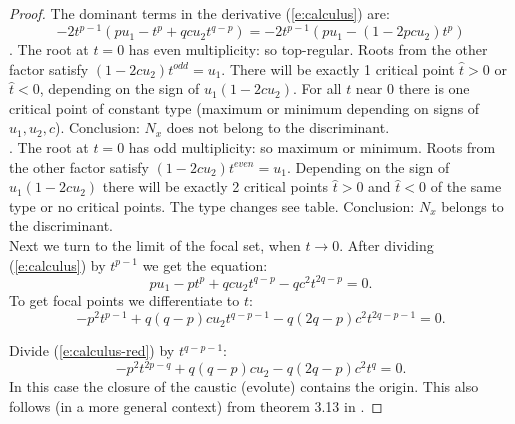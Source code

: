 \documentclass[12pt,a4,twoside]{amsart}
\newtheorem*{main lemma}{The main lemma}
\begin{document}
\begin{proof}
\noindent
{} The dominant terms in the derivative (\ref{e:calculus})  are:
\begin{equation}
- 2 t^{p-1}  (p  u_1  - t ^{p}  + q c u_2 t^{q-p}) = - 2 t^{p-1}  (p  u_1  - (1   - 2p c u_2 ) t^{p})
\end{equation}
. The root at $t=0$ has even multiplicity: so top-regular. Roots from the other factor satisfy $(1-2 cu_2) t^{odd} = u_1$.  There will be exactly 1 critical point $\hat{t}>0$ or $\hat{t}< 0$, depending on the sign of $u_1 (1 -2cu_2)$. For all $t$ near $0$ there is one critical point of constant type (maximum or minimum depending on signs of $u_1,u_2,c$).
Conclusion: $N_x$ does not belong to the discriminant.\\
. The root at $t=0$ has odd multiplicity: so maximum or minimum. Roots from the other factor satisfy $(1-2 cu_2) t^{even} = u_1$. 
Depending on the sign of $u_1 (1 -2cu_2)$ there will be exactly 2 critical points $\hat{t}>0$ and $\hat{t}< 0$ of the same type   or no critical points. The type changes see table.  
Conclusion: $N_x$  belongs to the discriminant.\\


\noindent
Next we turn to the limit of the focal set, when $t \to 0$.
After dividing  (\ref{e:calculus}) by $t^{p-1}$ we get the equation:
\begin{equation}\label{e:calculus-red}
 p u_1 -  p t^p + q  c u_2 t ^{q-p} -  q c^2  t ^{2q-p} = 0.
\end{equation}
To get focal points we differentiate to $t$:
\begin{equation}\label{e:focals-red}
- p^2 t^{p-1} + q (q-p) c  u_2t^{q-p-1} - q (2q-p) c^2 t^{2q -p-1} = 0.
\end{equation}

  Divide  (\ref{e:calculus-red}) by $t^{q-p-1}$: 
\begin{equation}\label{e:focals-small} 
-p^2 t^{2p-q} + q (q-p)c  u_2 - q (2q-p) c^2 t^q = 0.
\end{equation}
In this case the closure of the caustic (evolute) contains the origin. 
This also follows (in a more general context) from theorem 3.13 in \cite{BD}.


\end{proof}
\end{document}
